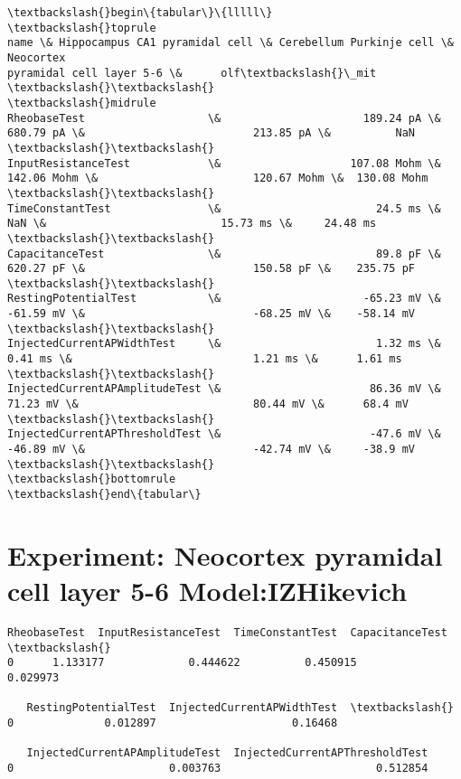 \documentclass[11pt]{article}
\begin{document}
    \begin{Verbatim}[commandchars=\\\{\}]
\textbackslash{}begin\{tabular\}\{lllll\}
\textbackslash{}toprule
name \& Hippocampus CA1 pyramidal cell \& Cerebellum Purkinje cell \& Neocortex
pyramidal cell layer 5-6 \&      olf\textbackslash{}\_mit \textbackslash{}\textbackslash{}
\textbackslash{}midrule
RheobaseTest                   \&                      189.24 pA \&
680.79 pA \&                          213.85 pA \&          NaN \textbackslash{}\textbackslash{}
InputResistanceTest            \&                    107.08 Mohm \&
142.06 Mohm \&                        120.67 Mohm \&  130.08 Mohm \textbackslash{}\textbackslash{}
TimeConstantTest               \&                        24.5 ms \&
NaN \&                           15.73 ms \&     24.48 ms \textbackslash{}\textbackslash{}
CapacitanceTest                \&                        89.8 pF \&
620.27 pF \&                          150.58 pF \&    235.75 pF \textbackslash{}\textbackslash{}
RestingPotentialTest           \&                      -65.23 mV \&
-61.59 mV \&                          -68.25 mV \&    -58.14 mV \textbackslash{}\textbackslash{}
InjectedCurrentAPWidthTest     \&                        1.32 ms \&
0.41 ms \&                            1.21 ms \&      1.61 ms \textbackslash{}\textbackslash{}
InjectedCurrentAPAmplitudeTest \&                       86.36 mV \&
71.23 mV \&                           80.44 mV \&      68.4 mV \textbackslash{}\textbackslash{}
InjectedCurrentAPThresholdTest \&                       -47.6 mV \&
-46.89 mV \&                          -42.74 mV \&     -38.9 mV \textbackslash{}\textbackslash{}
\textbackslash{}bottomrule
\textbackslash{}end\{tabular\}

    \end{Verbatim}

    \hypertarget{experiment-neocortex-pyramidal-cell-layer-5-6-modelizhikevich}{%
\section{Experiment: Neocortex pyramidal cell layer 5-6
Model:IZHikevich}\label{experiment-neocortex-pyramidal-cell-layer-5-6-modelizhikevich}}

            \begin{tcolorbox}[breakable, size=fbox, boxrule=.5pt, pad at break*=1mm, opacityfill=0]
\begin{Verbatim}[commandchars=\\\{\}]
   RheobaseTest  InputResistanceTest  TimeConstantTest  CapacitanceTest  \textbackslash{}
0      1.133177             0.444622          0.450915         0.029973

   RestingPotentialTest  InjectedCurrentAPWidthTest  \textbackslash{}
0              0.012897                     0.16468

   InjectedCurrentAPAmplitudeTest  InjectedCurrentAPThresholdTest
0                        0.003763                        0.512854
\end{Verbatim}
\end{tcolorbox}
        
\end{document}
